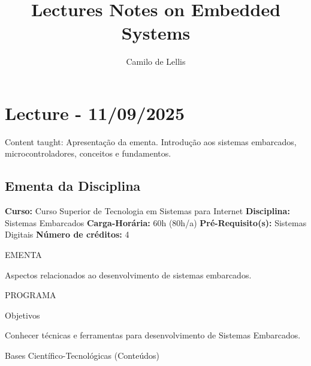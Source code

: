 \documentclass{article}
\title{Lectures Notes on Embedded Systems}
\author{Camilo de Lellis}
\begin{document}
\maketitle

\tableofcontents

\section{Lecture - 11/09/2025}
Content taught:  Apresentação da ementa. Introdução aos sistemas embarcados, microcontroladores, conceitos e fundamentos.

\subsection{Ementa da Disciplina}
\textbf{Curso:} Curso Superior de Tecnologia em Sistemas para Internet
\textbf{Disciplina:} Sistemas Embarcados \textbf{Carga-Horária:} 60h (80h/a)
\textbf{Pré-Requisito(s):} Sistemas Digitais \textbf{Número de créditos:} 4

\begin{center}
EMENTA
\end{center}
Aspectos relacionados ao desenvolvimento de sistemas embarcados.

\begin{center}
PROGRAMA
\end{center}

\begin{center}
Objetivos
\end{center}
Conhecer técnicas e ferramentas para desenvolvimento de Sistemas Embarcados.

\begin{center}
Bases Científico-Tecnológicas (Conteúdos)
\end{center}
\end{document}
